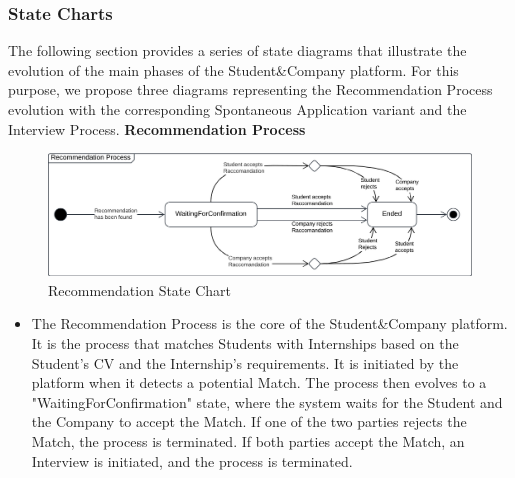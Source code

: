 \subsubsection{State Charts}
The following section provides a series of state diagrams that illustrate the evolution of the main phases of the Student\&Company platform. For this purpose, we propose three diagrams representing the Recommendation Process evolution with the corresponding Spontaneous Application variant and the Interview Process.
\newline\newline
\noindent\textbf{\color{titleColor}Recommendation Process}\\
\begin{figure}[ht]
    \centering
    \includegraphics[width=1 \textwidth]{Latex/Images/RecommendationStateChart.png}
    \caption{Recommendation State Chart}
    \label{fig:RecommendationProcess}
\end{figure}
\begin{itemize}
    \item The Recommendation Process is the core of the Student\&Company platform. It is the process that matches Students with Internships based on the Student's CV and the Internship's requirements. It is initiated by the platform when it detects a potential Match. The process then evolves to a "WaitingForConfirmation" state, where the system waits for the Student and the Company to accept the Match. If one of the two parties rejects the Match, the process is terminated. If both parties accept the Match, an Interview is initiated, and the process is terminated.
\end{itemize}

